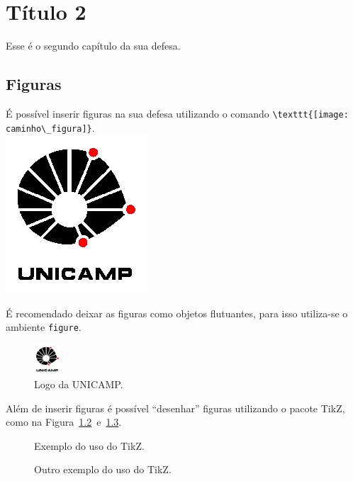 \chapter{Título 2}
Esse é o segundo capítulo da sua defesa.

\section{Figuras}
É possível inserir figuras na sua defesa utilizando o comando
\lstinline+\texttt{[image: caminho\_figura]}+. \\
\includegraphics{figuras/unicamp-logo.jpg}

É recomendado deixar as figuras como objetos flutuantes, para isso
utiliza-se o ambiente \lstinline+figure+.
\begin{figure}[!htb]
  \center
  \includegraphics[width=1cm]{figuras/unicamp-logo.jpg}
  \caption{Logo da UNICAMP.}
  \label{fig:log_unicamp}
\end{figure}

Além de inserir figuras é possível ``desenhar'' figuras
utilizando o pacote TikZ, como na
Figura~\ref{fig:exem_tikz1}~e~\ref{fig:exem_tikz2}.
\begin{figure}[!htb]
  \centering
  \caption{Exemplo do uso do TikZ.}
  \label{fig:exem_tikz1}
\end{figure}
\begin{figure}[!htb]
  \centering
  \caption{Outro exemplo do uso do TikZ.}
  \label{fig:exem_tikz2}
\end{figure}

